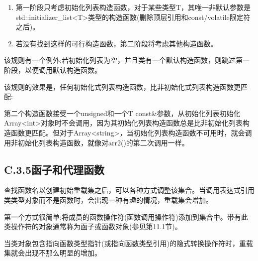 \begin{enumerate}
\item
第一阶段只考虑初始化列表构造函数，对于某些类型T，其唯一非默认参数是std::initializer\_list<T>类型的构造函数(删除顶层引用和const/volatile限定符之后)。

\item
若没有找到这样的可行构造函数，第二阶段将考虑其他构造函数。
\end{enumerate}

该规则有一个例外:若初始化列表为空，并且类有一个默认构造函数，则跳过第一阶段，以便调用默认构造函数。

该规则的效果是，任何初始化式列表构造函数，比非初始化式列表构造函数更匹配:


第二个构造函数接受一个unsigned和一个T const\&参数，从初始化列表初始化Array<int>对象时不会调用，因为其初始化列表构造函数总是比非初始化列表构造函数更匹配。但对于Array<string>，当初始化列表构造函数不可用时，就会调用非初始化列表构造函数，就像对arr2()的第二次调用一样。

\subsection{C.3.5\hspace{0.2cm}函子和代理函数}

查找函数名以创建初始重载集之后，可以各种方式调整该集合。当调用表达式引用类类型对象而不是函数时，会出现一种有趣的情况，重载集会增加。

第一个方式很简单:将成员的函数操作符(函数调用操作符)添加到集合中。带有此类操作符的对象通常称为函子或函数对象(参见第11.1节)。

当类对象包含指向函数类型指针(或指向函数类型引用)的隐式转换操作符时，重载集就会出现不那么明显的增加。

